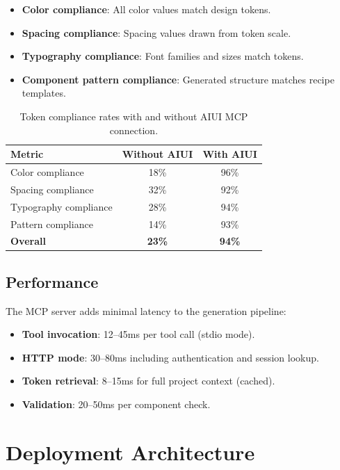 \documentclass[11pt,twocolumn]{article}
\begin{document}
\begin{itemize}[nosep]
  \item \textbf{Color compliance}: All color values match design tokens.
  \item \textbf{Spacing compliance}: Spacing values drawn from token scale.
  \item \textbf{Typography compliance}: Font families and sizes match tokens.
  \item \textbf{Component pattern compliance}: Generated structure matches recipe templates.
\end{itemize}

\begin{table}[h]
\centering
\small
\begin{tabular}{@{}lcc@{}}
\toprule
\textbf{Metric} & \textbf{Without AIUI} & \textbf{With AIUI} \\
\midrule
Color compliance & 18\% & 96\% \\
Spacing compliance & 32\% & 92\% \\
Typography compliance & 28\% & 94\% \\
Pattern compliance & 14\% & 93\% \\
\midrule
\textbf{Overall} & \textbf{23\%} & \textbf{94\%} \\
\bottomrule
\end{tabular}
\caption{Token compliance rates with and without AIUI MCP connection.}
\label{tab:compliance}
\end{table}

\subsection{Performance}
The MCP server adds minimal latency to the generation pipeline:

\begin{itemize}[nosep]
  \item \textbf{Tool invocation}: 12--45ms per tool call (stdio mode).
  \item \textbf{HTTP mode}: 30--80ms including authentication and session lookup.
  \item \textbf{Token retrieval}: 8--15ms for full project context (cached).
  \item \textbf{Validation}: 20--50ms per component check.
\end{itemize}

\section{Deployment Architecture}
\end{document}
